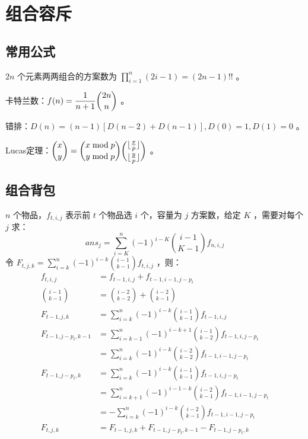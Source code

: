 \section{组合容斥}

\subsection{常用公式}

$2n$ 个元素两两组合的方案数为 $\displaystyle\prod_{i=1}^{n}(2i-1)=(2n-1)!!$ 。

卡特兰数：$\displaystyle f(n)={1\over n+1}{2n\choose n}$ 。

\vspace{0.2cm}

错排：$\displaystyle D(n)=(n-1)[D(n-2)+D(n-1)],D(0)=1,D(1)=0$ 。

\vspace{0.2cm}

Lucas定理：$\displaystyle {x\choose y}={x\bmod p\choose y\bmod p}{\lfloor{x\over p}\rfloor\choose \lfloor{y\over p}\rfloor}$ 。

\subsection{组合背包}

$n$ 个物品，$f_{t,i,j}$ 表示前 $t$ 个物品选 $i$ 个，容量为 $j$ 方案数，给定 $K$ ，需要对每个 $j$ 求：
$$
ans_j=\sum_{i=K}^{n}(-1)^{i-K}{i-1\choose K-1}f_{n,i,j}
$$
令 $\displaystyle F_{t,j,k}=\sum_{i=k}^{n}(-1)^{i-k}{i-1\choose k-1}f_{t,i,j}$ ，则：
$$
\begin{aligned}
f_{t,i,j}&=f_{t-1,i,j}+f_{t-1,i-1,j-p_t}\\
{i-1\choose k-1}&={i-2\choose k-2}+{i-2\choose k-1}\\
F_{t-1,j,k}&=\sum_{i=k}^{n}(-1)^{i-k}{i-1\choose k-1}f_{t-1,i,j}\\
F_{t-1,j-p_t,k-1}&=\sum_{i=k-1}^{n}(-1)^{i-k+1}{i-1\choose k-2}f_{t-1,i,j-p_t}\\
&=\sum_{i=k}^{n}(-1)^{i-k}{i-2\choose k-2}f_{t-1,i-1,j-p_t}\\
F_{t-1,j-p_t,k}&=\sum_{i=k}^{n}(-1)^{i-k}{i-1\choose k-1}f_{t-1,i,j-p_t}\\
&=\sum_{i=k+1}^{n}(-1)^{i-1-k}{i-2\choose k-1}f_{t-1,i-1,j-p_t}\\
&=-\sum_{i=k}^{n}(-1)^{i-k}{i-2\choose k-1}f_{t-1,i-1,j-p_t}\\
F_{t,j,k}&=F_{t-1,j,k}+F_{t-1,j-p_t,k-1}-F_{t-1,j-p_t,k}
\end{aligned}
$$


